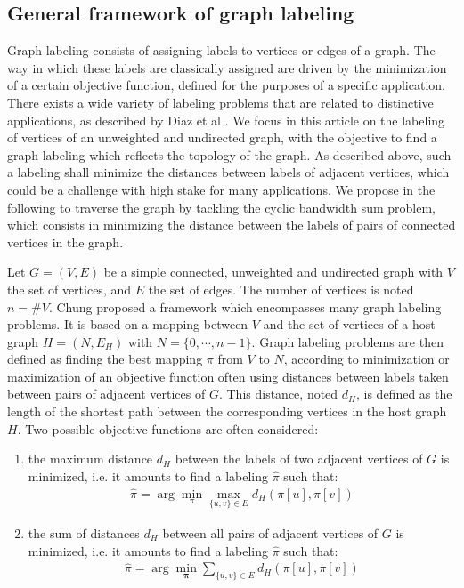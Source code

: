 \documentclass{scrartcl}
\theoremstyle{plain}
\begin{document}
\subsection{General framework of graph labeling}

Graph labeling consists of assigning labels to vertices or edges of a graph. The 
way in which these labels are classically assigned are driven by the 
minimization of a certain objective function, defined for the purposes of a 
specific application. There exists a wide variety of labeling problems that are 
related to distinctive applications, as described by Diaz et al \cite{Diaz2002}. 
We focus in this article on the labeling of vertices of an unweighted and 
undirected graph, with the objective to find a graph labeling which reflects the 
topology of the graph. As described above, such a labeling shall minimize the 
distances between labels of adjacent vertices, which could be a challenge with 
high stake for many applications. We propose in the following to traverse the 
graph by tackling the cyclic bandwidth sum problem, which consists in minimizing 
the distance between the labels of pairs of connected vertices in the graph.

Let $G=(V,E)$ be a simple connected, unweighted and undirected graph with $V$ 
the set of vertices, and $E$ the set of edges. The number of vertices is noted 
$n = \# V$. Chung \cite{Chung1988} proposed a framework which encompasses many 
graph labeling problems. It is based on a mapping between $V$ and the set of 
vertices of a host graph $H = (N, E_H)$ with $N = \{0, \cdots, n-1\}$. Graph 
labeling problems are then defined as finding the best mapping $\pi$ from $V$ to 
$N$, according to minimization or maximization of an objective function often 
using distances between labels taken between pairs of adjacent vertices of $G$. 
This distance, noted $d_H$, is defined as the length of the shortest path 
between the corresponding vertices in the host graph $H$. Two possible objective 
functions are often considered:

\begin{enumerate}
\item the maximum distance $d_H$ between the labels of two adjacent vertices of 
$G$ is minimized, i.e. it amounts to find a labeling $\hat{\pi}$ such 
that:
  \begin{align}
    \hat{\pi} = \arg\min_\pi\max_{\{u,v\}\in E}d_H(\pi[u],\pi[v])
  \end{align}
\item the sum of distances $d_H$ between all pairs of adjacent vertices of $G$ 
is minimized, i.e. it amounts to find a labeling $\hat{\pi}$ such that: 
  \begin{align}
    \hat{\pi} = \arg\min_{\mathbf{\pi}} \sum_{\{u,v\}\in E} d_H(\pi[u],\pi[v])
  \end{align}
\end{enumerate}
\end{document}
